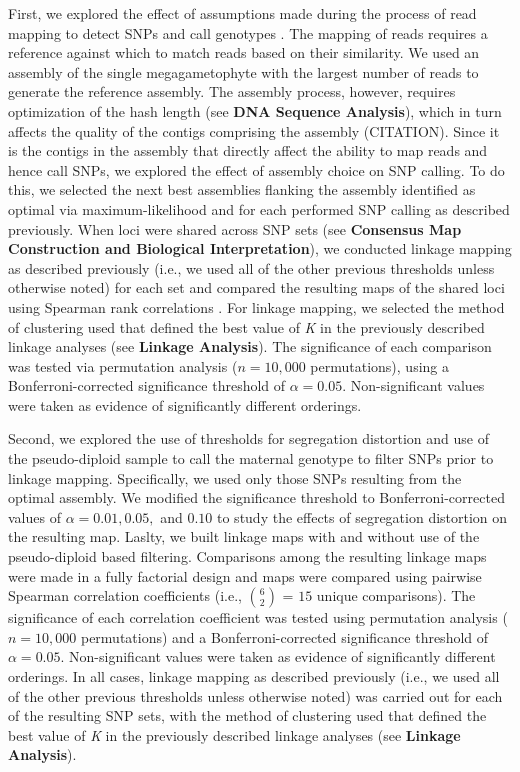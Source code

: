 \documentclass[11pt]{article}
\begin{document}
First, we explored the effect of assumptions made during the process of read mapping to detect SNPs and call genotypes \citep[cf.][]{Pool:2010}.
The mapping of reads requires a reference against which to match reads based on their similarity. We used an assembly
of the single megagametophyte with the largest number of reads to generate the
reference assembly. The assembly process, however, requires optimization of the hash length (see \textbf{DNA Sequence Analysis}),
which in turn affects the quality of the contigs comprising the assembly (CITATION).  
Since it is the contigs in the assembly that directly affect the ability to map reads and hence call SNPs, we explored the effect
of assembly choice on SNP calling. To do this, we selected the next best assemblies flanking the assembly identified as optimal via maximum-likelihood
and for each performed SNP calling as described previously. When loci were shared across SNP sets (see \textbf{Consensus Map 
Construction and Biological Interpretation}), we conducted linkage mapping as
described previously (i.e., we used all of the other previous thresholds unless otherwise noted) for each
set and compared the resulting maps of the shared loci using Spearman rank correlations \citep{Spearman:1904}. 
For linkage mapping, we selected the method of clustering used that defined the best 
value of \textit{K} in the previously described linkage analyses (see \textbf{Linkage Analysis}). 
The significance of each comparison was tested via permutation 
analysis ($n = 10,000$ permutations), using a Bonferroni-corrected significance threshold of $\alpha = 0.05$. Non-significant values 
were taken as evidence of significantly different orderings.

Second, we explored the use of thresholds for segregation distortion and 
use of the pseudo-diploid sample to call the maternal genotype to filter SNPs prior to linkage mapping. 
Specifically, we used only those SNPs resulting from the optimal assembly.
We modified the significance threshold to Bonferroni-corrected values of $\alpha = 0.01, 0.05,$ and $0.10$ to 
study the effects of segregation distortion on the resulting map. Laslty, we built linkage maps with and without
use of the pseudo-diploid based filtering. Comparisons among the resulting linkage maps were made
in a fully factorial design and maps were compared using pairwise Spearman correlation coefficients 
(i.e., {$6 \choose 2$} = $15$ unique comparisons). The significance of each correlation coefficient 
was tested using permutation analysis ($n = 10,000$ permutations) and a Bonferroni-corrected significance threshold of $\alpha = 0.05$. 
Non-significant values were taken as evidence of significantly different orderings.
In all cases, linkage mapping as described previously  (i.e., we used all of the other previous thresholds unless otherwise noted) 
was carried out for each of the resulting SNP sets, with the method of clustering used that defined 
the best value of \textit{K} in the previously described linkage analyses (see \textbf{Linkage Analysis}). 
\end{document}
